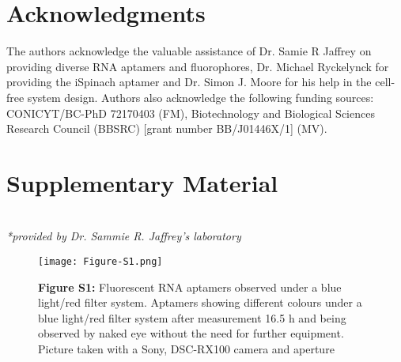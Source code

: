 \section{\textbf{Acknowledgments}}

  
The authors acknowledge the valuable assistance of Dr. Samie R Jaffrey on providing diverse RNA aptamers and fluorophores, Dr. Michael Ryckelynck for providing the iSpinach aptamer and Dr. Simon J. Moore for his help in the cell-free system design. Authors also acknowledge the following funding sources: CONICYT/BC-PhD 72170403 (FM), Biotechnology and Biological Sciences Research Council (BBSRC) [grant number BB/J01446X/1] (MV).

\section{\textbf{Supplementary Material}}


\begin{table}[h]

{
\\
\textit{*provided by Dr. Sammie R. Jaffrey's laboratory}}
\end{table}

\begin{figure*} [h] 
\begin{center}
\texttt{[image: Figure-S1.png]}
\end{center}
\captionsetup{labelformat=empty}
\caption{\textbf{Figure S1:} Fluorescent RNA aptamers observed under a blue  light/red  filter  system. Aptamers  showing  different  colours  under  a  blue  light/red  filter  system  after measurement 16.5 h and being observed by naked eye without the need for further equipment. Picture taken with a Sony, DSC-RX100 camera and aperture}
\label{NAR-figS1}%
\end{figure*}

